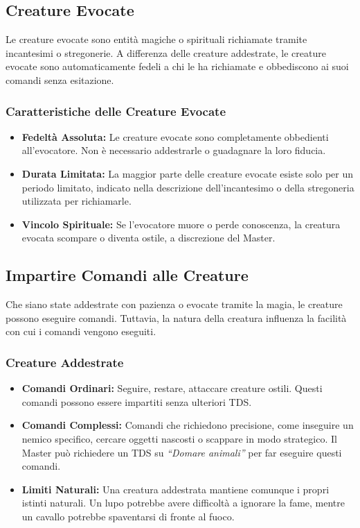 \documentclass[../manuale_main.tex]{subfiles}
\begin{document}
\subsection{Creature Evocate}

Le creature evocate sono entità magiche o spirituali richiamate tramite incantesimi o stregonerie. A differenza delle creature addestrate, le creature evocate sono automaticamente fedeli a chi le ha richiamate e obbediscono ai suoi comandi senza esitazione.

\subsubsection{Caratteristiche delle Creature Evocate}
\begin{itemize}
    \item \textbf{Fedeltà Assoluta:} Le creature evocate sono completamente obbedienti all'evocatore. Non è necessario addestrarle o guadagnare la loro fiducia.
    \item \textbf{Durata Limitata:} La maggior parte delle creature evocate esiste solo per un periodo limitato, indicato nella descrizione dell'incantesimo o della stregoneria utilizzata per richiamarle.
    \item \textbf{Vincolo Spirituale:} Se l'evocatore muore o perde conoscenza, la creatura evocata scompare o diventa ostile, a discrezione del Master.
\end{itemize}

\subsection{Impartire Comandi alle Creature}

Che siano state addestrate con pazienza o evocate tramite la magia, le creature possono eseguire comandi. Tuttavia, la natura della creatura influenza la facilità con cui i comandi vengono eseguiti.

\subsubsection{Creature Addestrate}
\begin{itemize}
    \item \textbf{Comandi Ordinari:} Seguire, restare, attaccare creature ostili. Questi comandi possono essere impartiti senza ulteriori TDS.
    \item \textbf{Comandi Complessi:} Comandi che richiedono precisione, come inseguire un nemico specifico, cercare oggetti nascosti o scappare in modo strategico. Il Master può richiedere un TDS su \emph{``Domare animali''} per far eseguire questi comandi.
    \item \textbf{Limiti Naturali:} Una creatura addestrata mantiene comunque i propri istinti naturali. Un lupo potrebbe avere difficoltà a ignorare la fame, mentre un cavallo potrebbe spaventarsi di fronte al fuoco.
\end{itemize}
\end{document}
